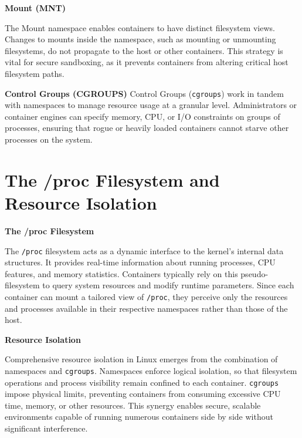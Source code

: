 \textbf{Mount (MNT)}

The Mount namespace enables containers to have distinct filesystem views. Changes to mounts inside the namespace, such as mounting or unmounting filesystems, do not propagate to the host or other containers. This strategy is vital for secure sandboxing, as it prevents containers from altering critical host filesystem paths.

\textbf{Control Groups (CGROUPS)}
Control Groups (\texttt{cgroups}) work in tandem with namespaces to manage resource usage at a granular level. Administrators or container engines can specify memory, CPU, or I/O constraints on groups of processes, ensuring that rogue or heavily loaded containers cannot starve other processes on the system.


\section{The /proc Filesystem and Resource Isolation}

\textbf{The /proc Filesystem}

The \texttt{/proc} filesystem acts as a dynamic interface to the kernel’s internal data structures. It provides real-time information about running processes, CPU features, and memory statistics. Containers typically rely on this pseudo-filesystem to query system resources and modify runtime parameters. Since each container can mount a tailored view of \texttt{/proc}, they perceive only the resources and processes available in their respective namespaces rather than those of the host.

\textbf{Resource Isolation}

Comprehensive resource isolation in Linux emerges from the combination of namespaces and \texttt{cgroups}. Namespaces enforce logical isolation, so that filesystem operations and process visibility remain confined to each container. \texttt{cgroups} impose physical limits, preventing containers from consuming excessive CPU time, memory, or other resources. This synergy enables secure, scalable environments capable of running numerous containers side by side without significant interference.

